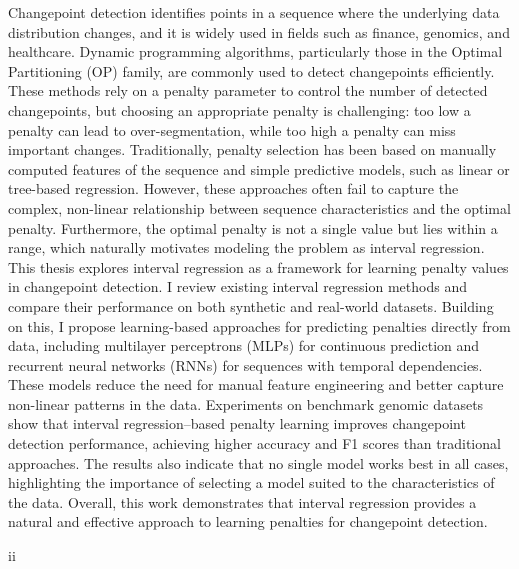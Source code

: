 \documentclass[12pt]{article}
\begin{document}
Changepoint detection identifies points in a sequence where the underlying data distribution changes, and it is widely used in fields such as finance, genomics, and healthcare. Dynamic programming algorithms, particularly those in the Optimal Partitioning (OP) family, are commonly used to detect changepoints efficiently. These methods rely on a penalty parameter to control the number of detected changepoints, but choosing an appropriate penalty is challenging: too low a penalty can lead to over-segmentation, while too high a penalty can miss important changes.
Traditionally, penalty selection has been based on manually computed features of the sequence and simple predictive models, such as linear or tree-based regression. However, these approaches often fail to capture the complex, non-linear relationship between sequence characteristics and the optimal penalty. Furthermore, the optimal penalty is not a single value but lies within a range, which naturally motivates modeling the problem as interval regression.
This thesis explores interval regression as a framework for learning penalty values in changepoint detection. I review existing interval regression methods and compare their performance on both synthetic and real-world datasets. Building on this, I propose learning-based approaches for predicting penalties directly from data, including multilayer perceptrons (MLPs) for continuous prediction and recurrent neural networks (RNNs) for sequences with temporal dependencies. These models reduce the need for manual feature engineering and better capture non-linear patterns in the data.
Experiments on benchmark genomic datasets show that interval regression–based penalty learning improves changepoint detection performance, achieving higher accuracy and F1 scores than traditional approaches. The results also indicate that no single model works best in all cases, highlighting the importance of selecting a model suited to the characteristics of the data. Overall, this work demonstrates that interval regression provides a natural and effective approach to learning penalties for changepoint detection.

\vfill
\begin{center}
ii
\end{center}

\clearpage
\renewcommand{\thepage}{\arabic{page}}

\clearpage
\setcounter{page}{3}
\renewcommand{\thepage}{\roman{page}}
\end{document}
